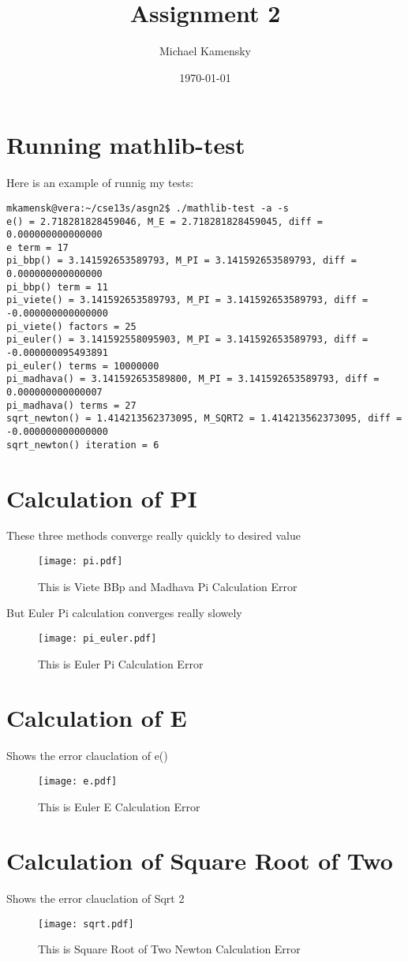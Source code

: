 \documentclass[11pt]{article} %
\title{Assignment 2}
\author{Michael Kamensky}
\date{\today} %
\begin{document}
\maketitle %
\section{Running mathlib-test}
Here is an example of runnig my tests:

\begin{verbatim} 
mkamensk@vera:~/cse13s/asgn2$ ./mathlib-test -a -s
e() = 2.718281828459046, M_E = 2.718281828459045, diff = 0.000000000000000
e term = 17
pi_bbp() = 3.141592653589793, M_PI = 3.141592653589793, diff = 0.000000000000000
pi_bbp() term = 11
pi_viete() = 3.141592653589793, M_PI = 3.141592653589793, diff = -0.000000000000000
pi_viete() factors = 25
pi_euler() = 3.141592558095903, M_PI = 3.141592653589793, diff = -0.000000095493891
pi_euler() terms = 10000000
pi_madhava() = 3.141592653589800, M_PI = 3.141592653589793, diff = 0.000000000000007
pi_madhava() terms = 27
sqrt_newton() = 1.414213562373095, M_SQRT2 = 1.414213562373095, diff = -0.000000000000000
sqrt_newton() iteration = 6
\end{verbatim}
\section{Calculation of PI}
These three methods converge really quickly to desired value
\begin{figure}[H]
\begin{center}
\texttt{[image: pi.pdf]}
\caption{This is Viete BBp and Madhava Pi Calculation Error}
\end{center}
\end{figure}

But Euler Pi calculation converges really slowely
\begin{figure}[H]
\begin{center}
\texttt{[image: pi\_euler.pdf]}
\caption{This is Euler Pi Calculation Error}
\end{center}
\end{figure}

\section{Calculation of E}
Shows the error clauclation of e()
\begin{figure}[H]
\begin{center}
\texttt{[image: e.pdf]}
\caption{This is Euler E Calculation Error}
\end{center}
\end{figure}

\section{Calculation of Square Root of Two}
Shows the error clauclation of Sqrt 2
\begin{figure}[H]
\begin{center}
\texttt{[image: sqrt.pdf]}
\caption{This is Square Root of Two Newton Calculation Error}
\end{center}
\end{figure}
\end{document}
